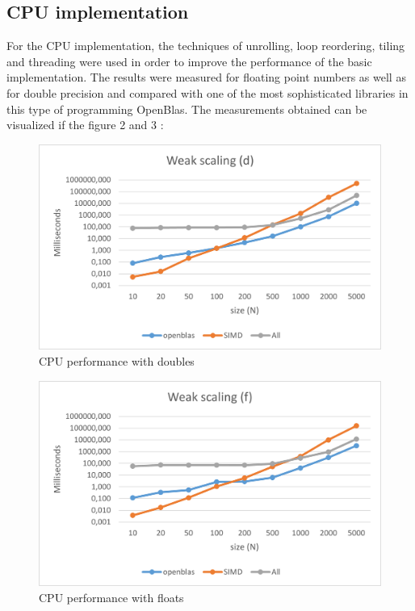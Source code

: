 \documentclass[12p,english]{article}
\begin{document}
\subsection{CPU implementation}
For the CPU implementation, the techniques of unrolling, loop reordering, tiling and threading were used in order to improve the performance of the basic implementation. The results were measured for floating point numbers as well as for double precision and compared with one of the most sophisticated libraries in this type of programming OpenBlas. The measurements obtained can be visualized if the figure 2 and 3 :

\begin{figure}[h]
\centering
\includegraphics[scale= 0.55]{CPUd.png}
\caption{CPU performance with doubles}
\end{figure}
\begin{figure}[h]
\centering
\includegraphics[scale= 0.55]{CPUf.png}
\caption{CPU performance with floats}
\end{figure}
\end{document}
